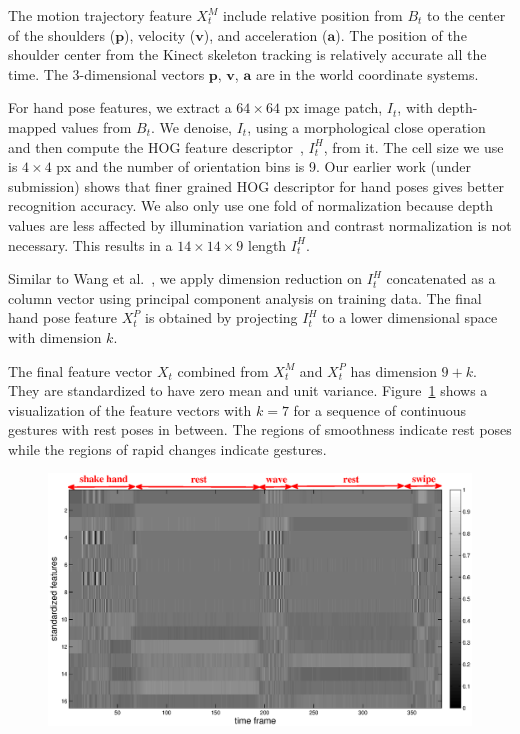 \documentclass{sigchi}
\begin{document}
The motion trajectory feature $X_t^M$ include relative
position from $B_t$ to the center of the shoulders
($\mathbf{p}$), velocity ($\mathbf{v}$), and acceleration ($\mathbf{a}$). The position of the shoulder center from the Kinect
skeleton tracking is relatively accurate all the time. The 3-dimensional
vectors $\mathbf{p}$, $\mathbf{v}$, $\mathbf{a}$ are in the world coordinate systems.

For hand pose features, we extract a $64\times 64$ px
image patch, $I_t$, with depth-mapped values from $B_t$.
We denoise, $I_t$, using a morphological close operation and then compute the
HOG feature descriptor~\cite{dalal05}, $I_t^H$, from it. The cell size we use is
$4\times 4$ px and the number of orientation bins is 9. Our earlier work (under
submission) shows that finer grained HOG descriptor for hand poses gives better
recognition accuracy. We also only use one fold of normalization because depth
values are less affected by illumination variation and contrast normalization is
not necessary. This results in a $14\times 14\times 9$ length $I_t^H$.

Similar to Wang et al.~\cite{wang-spatio-2009}, we apply dimension reduction on
$I_t^H$ concatenated as a column vector using principal component analysis on
training data.
The final hand pose feature $X_t^P$ is obtained by projecting $I_t^H$ to a lower
dimensional space with dimension $k$.

The final feature vector $X_t$ combined from $X_t^M$ and $X_t^P$ has dimension
$9 + k$. They are standardized to have zero mean and unit variance.
Figure~\ref{fig:feature} shows a visualization of the feature vectors with $k=7$
for a sequence of continuous gestures with rest poses in between. The regions of
smoothness indicate rest poses while the regions of rapid changes indicate
gestures.

\begin{figure}
\centering
\includegraphics[width=1\columnwidth,trim=20mm 5mm 30mm 1mm,
clip]{figure/pca16.eps}
\caption{}
\label{fig:feature}
\end{figure}
\end{document}
